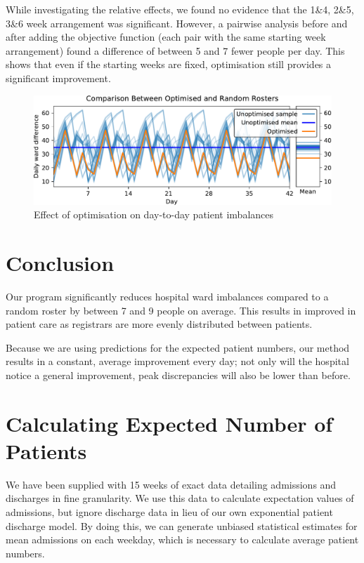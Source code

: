 \documentclass[a4paper]{article}
\begin{document}
While investigating the relative effects, we found no evidence that the 1\&4, 2\&5, 3\&6 week arrangement was significant. However, a pairwise analysis before and after adding the objective function (each pair with the same starting week arrangement) found a difference of between 5 and 7 fewer people per day. This shows that even if the starting weeks are fixed, optimisation still provides a significant improvement.

\begin{figure}[h]
    \centering\includegraphics[width=\linewidth]{../results/comparison}
    \caption{Effect of optimisation on day-to-day patient imbalances}
    \label{fig:comparison}
\end{figure}

\section{Conclusion}

Our program significantly reduces hospital ward imbalances compared to a random roster by between 7 and 9 people on average. This results in improved in patient care as registrars are more evenly distributed between patients.

Because we are using predictions for the expected patient numbers, our method results in a constant, average improvement every day; not only will the hospital notice a general improvement, peak discrepancies will also be lower than before.

\newpage
\appendix
\iffalse
\section{Calculating Expected Number of Patients}

We have been supplied with 15 weeks of exact data detailing admissions and discharges in fine granularity. We use this data to calculate expectation values of admissions, but ignore discharge data in lieu of our own exponential patient discharge model. By doing this, we can generate unbiased statistical estimates for mean admissions on each weekday, which is necessary to calculate average patient numbers.
\end{document}
